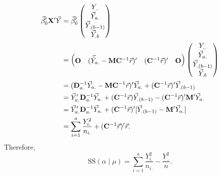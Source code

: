 \begin{align*}
    \vec{\beta}_0'\mathbf{X}'\vec{Y}
     & =\vec{\beta}_0'\begin{pmatrix}
                             Y_{..}              \\
                             \vec{Y}_{a.}     \\
                             \vec{Y}_{.(b-1)} \\
                             \vec{Y}_{.b}
                         \end{pmatrix}                                                                                                                      \\
     & =\begin{pmatrix}
            \mathbf{O}                                                    &
            ( \vec{\bar{Y}}_{a.}-\mathbf{M}\mathbf{C}^{-1}\vec{r})' &
            ( \mathbf{C}^{-1}\vec{r} )'                                &
            \mathbf{O}
        \end{pmatrix}\begin{pmatrix}
                         Y_{..}              \\
                         \vec{Y}_{a.}     \\
                         \vec{Y}_{.(b-1)} \\
                         \vec{Y}_{.b}
                     \end{pmatrix}                                                                            \\
     & =(\mathbf{D}_{a.}^{-1}\vec{Y}_{a.}-\mathbf{M}\mathbf{C}^{-1}\vec{r})'\vec{Y}_{a.}+(\mathbf{C}^{-1}\vec{r})'\vec{Y}_{.(b-1)}                 \\
     & =\vec{Y}_{a.}'\mathbf{D}_{a.}^{-1}\vec{Y}_{a.}+(\mathbf{C}^{-1}\vec{r})\vec{Y}_{.(b-1)}-(\mathbf{C}^{-1}\vec{r})'\mathbf{M}'\vec{Y}_{a.} \\
     & =\vec{Y}_{a.}'\mathbf{D}_{a.}^{-1}\vec{Y}_{a.}+(\mathbf{C}^{-1}\vec{r})'[\vec{Y}_{.(b-1)}-\mathbf{M}'\vec{Y}_{a.}]                          \\
     & =\sum_{i=1}^{a}\frac{Y_{i.}^2}{n_{i.}}+(\mathbf{C}^{-1}\vec{r})'\vec{r}.
\end{align*}
Therefore,
\[ \text{SS}(\alpha\mid \mu)=\sum_{i=1}^{a}\frac{Y_{i.}^2}{n_{i.}}-\frac{Y_{..}^2}{n}. \]
